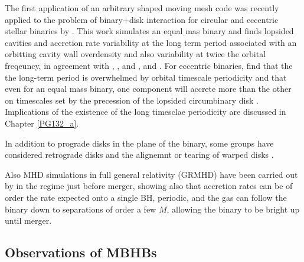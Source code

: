 The first application of an arbitrary shaped moving mesh code \citep{AREPO} was recently applied to the problem of binary+disk interaction for circular and eccentric stellar binaries by \cite{MunozLai:2016}. This work simulates an equal mas binary and finds lopsided cavities and accretion rate variability at the long term period associated with an orbitting cavity wall overdensity and also variability at twice the orbital freqeuncy, in agreement with \cite{DHM:2013}, \cite{Farris:2014}, and \cite{ShiKrolik:2012}, and \cite{ShiKrolik:2015}. For eccentric binaries, \cite{MunozLai:2016} find that the the long-term period is overwhelmed by orbital timescale periodicity and that even for an equal mass binary, one component will accrete more than the other on timescales set by the precession of the lopsided circumbinary disk \citep[see also][]{Dunhill+2015}. Implications of the existence of the long timesclae periodicity are discussed in Chapter \ref{PG132_a}.



In addition to prograde disks in the plane of the binary, some groups have considered retrograde disks \citep{Nixon:2011:LongSim, RoedigSGmigrate:2014, DunhillNixon:2014, BankertShiKrolik:2015, NixonLubow:RetroRes:2015, AmaroSeoane:RetroDiscs:2016} and the alignemnt or tearing of warped disks \citep{NixonKingPringle:2011, Nixon:CntrAlign:2012, Hayasaki:misalignSims:2013, NixonKing:Tear:2013, DoganNixonKingPrice:2015}.

Also MHD simulations in full general relativity (GRMHD) have been carried out
by \cite{FarrisLiuShap:2010:Bondi, FarrisShap:2011, FarrisGold:2012,
Gold:GRMHD_CBD:2014, Gold:GRMHD_CBDII:2014} in the regime just before merger,
showing also that accretion rates can be of order the rate expected onto a
single BH, periodic, and the gas can follow the binary down to separations of
order a few $M$, allowing the binary to be bright up until merger.






\subsection{Observations of MBHBs}

